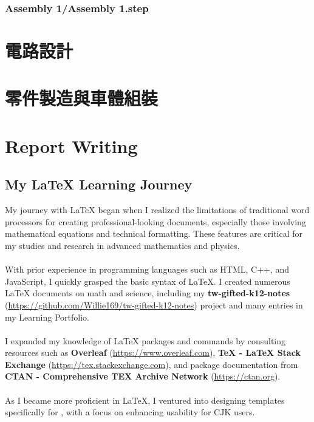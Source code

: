 \documentclass[a4paper,12pt]{article}
\begin{document}
\subsubsection{Assembly 1/Assembly 1.step}


\section{電路設計}

\section{零件製造與車體組裝}

\section{Report Writing}
\subsection{My \LaTeX{} Learning Journey}
My journey with \LaTeX{} began when I realized the limitations of traditional word processors for creating professional-looking documents, especially those involving mathematical equations and technical formatting. These features are critical for my studies and research in advanced mathematics and physics.\\\\
With prior experience in programming languages such as HTML, C++, and JavaScript, I quickly grasped the basic syntax of \LaTeX. I created numerous \LaTeX{} documents on math and science, including my \textbf{tw-gifted-k12-notes} (\href{https://github.com/Willie169/tw-gifted-k12-notes}{https://github.com/Willie169/tw-gifted-k12-notes}) project and many entries in my Learning Portfolio.\\\\
I expanded my knowledge of \LaTeX{} packages and commands by consulting resources such as \textbf{Overleaf} (\href{https://www.overleaf.com}{https://www.overleaf.com}), \textbf{TeX - LaTeX Stack Exchange} (\href{https://tex.stackexchange.com}{https://tex.stackexchange.com}), and package documentation from \textbf{CTAN - Comprehensive TEX Archive Network} (\href{https://ctan.org}{https://ctan.org}).\\\\
As I became more proficient in \LaTeX, I ventured into designing templates specifically for \XeTeX, with a focus on enhancing usability for CJK users.
\end{document}
